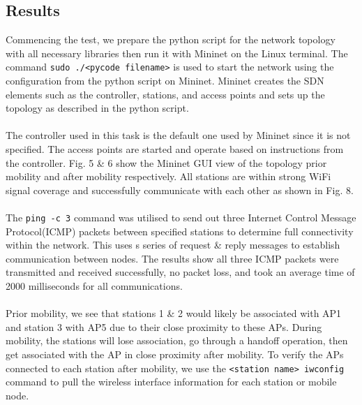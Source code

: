 \documentclass{article}
\begin{document}
\subsection{Results}
Commencing the test, we prepare the python script for the network topology with all necessary libraries then run it with Mininet on the Linux terminal. The command \texttt{sudo ./<pycode filename>} is used to start the network using the configuration from the python script on Mininet. Mininet creates the SDN elements such as the controller, stations, and access points and sets up the topology as described in the python script. \\\\ The controller used in this task is the default one used by Mininet since it is not specified. The access points are started and operate based on instructions from the controller. Fig. 5 \& 6 show the Mininet GUI view of the topology prior mobility and after mobility respectively. All stations are within strong WiFi signal coverage and successfully communicate with each other as shown in Fig. 8. \\\\ The \texttt{ping -c 3} command was utilised to send out three Internet Control Message Protocol(ICMP) packets between specified stations to determine full connectivity within the network. This uses s series of request \& reply messages to establish communication between nodes. The results show all three ICMP packets were transmitted and received successfully, no packet loss, and took an average time of 2000 milliseconds for all communications. \\\\ Prior mobility, we see that stations 1 \& 2 would likely be associated with AP1 and station 3 with AP5 due to their close proximity to these APs. During mobility, the stations will lose association, go through a handoff operation, then get associated with the AP in close proximity after mobility. To verify the APs connected to each station after mobility, we use the \texttt{<station name> iwconfig} command to pull the wireless interface information for each station or mobile node.
\end{document}
